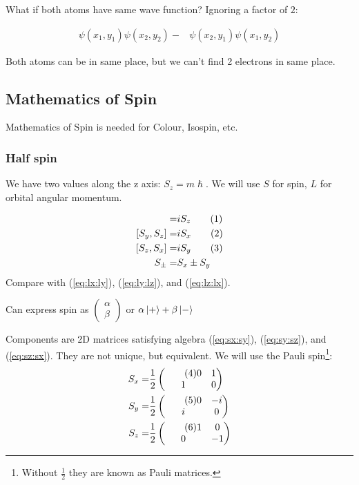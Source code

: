 \documentclass[]{article}
\newcommand\numberthis{\addtocounter{equation}{1}\tag{\theequation}}
\begin{document}
What if both atoms have same wave function? Ignoring a factor of $2$:

\begin{align*}
	\psi(x_1,y_1) \psi(x_2,y_2) -& \psi(x_2,y_1) \psi(x_1,y_2) 
\end{align*}

Both atoms can be in same place, but we can't find 2 electrons in same place.

\subsection{Mathematics of Spin}

Mathematics of Spin is needed for Colour, Isospin, etc.

\subsubsection{Half spin}

We have two values along the z axis: $S_z = m \hslash$. We will use $S$ for spin, $L$ for orbital angular momentum.

\begin{align*}
	[S_x,S_y] =& i S_z \numberthis \label{eq:sx:sy}\\
	[S_y,S_z] =& i S_x  \numberthis \label{eq:sy:sz}\\
	[S_z,S_x] =& i S_y  \numberthis \label{eq:sz:sx}\\
	S_\pm =& S_x \pm S_y
\end{align*}
Compare with (\ref{eq:lx:ly}),  (\ref{eq:ly:lz}), and  (\ref{eq:lz:lx}).

Can express spin as $\begin{pmatrix}
\alpha\\
\beta
\end{pmatrix}$ or $\alpha\ket{+} + \beta\ket{-}$ 

Components are 2D matrices satisfying algebra (\ref{eq:sx:sy}), (\ref{eq:sy:sz}), and (\ref{eq:sz:sx}). They are not unique, but equivalent. We will use the Pauli spin\footnote{Without $\frac{1}{2}$ they are known as Pauli matrices.}:
\begin{align*}
	S_x =& \frac{1}{2}\begin{pmatrix} \numberthis \label{eq:pauli:x}
		0&1\\
		1&0
	\end{pmatrix}\\
	S_y =& \frac{1}{2}\begin{pmatrix} \numberthis \label{eq:pauli:y}
		0&-i\\
		i&0
	\end{pmatrix}\\
	S_z =& \frac{1}{2}\begin{pmatrix} \numberthis \label{eq:pauli:z}
		1&0\\
		0&-1
	\end{pmatrix}
\end{align*}
\end{document}
